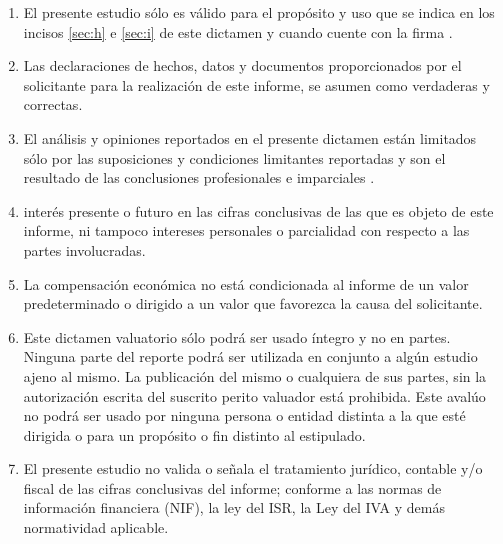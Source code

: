 \begin{enumerate}
	\item El presente estudio s\'olo es v\'alido para el prop\'osito y uso que se indica en los incisos \ref{sec:h} e \ref{sec:i} de este dictamen y cuando cuente con la firma .
	\item Las declaraciones de hechos, datos y documentos proporcionados por el solicitante para la realizaci\'on de este informe, se asumen como verdaderas y correctas.
	\item El an\'alisis y opiniones reportados en el presente dictamen est\'an limitados s\'olo por las suposiciones y condiciones limitantes reportadas y son el resultado de las conclusiones profesionales e imparciales  .
	\item  {} inter\'es presente o futuro en las cifras conclusivas de las que es objeto de este informe, ni tampoco   intereses personales o parcialidad con respecto a las partes involucradas.
	\item La compensaci\'on econ\'omica   no est\'a condicionada al informe de un valor predeterminado o dirigido a un valor que favorezca la causa del solicitante.
	\item Este dictamen valuatorio s\'olo podr\'a ser usado \'integro y no en partes. Ninguna parte del reporte podr\'a ser utilizada en conjunto a alg\'un estudio ajeno al mismo. La publicaci\'on del mismo o cualquiera de sus partes, sin la autorizaci\'on escrita del suscrito perito valuador est\'a prohibida. Este aval\'uo no podr\'a ser usado por ninguna persona o entidad distinta a la que est\'e dirigida o para un prop\'osito o fin distinto al estipulado.
	\item El presente estudio no valida o se\~nala el tratamiento jur\'idico, contable y/o fiscal de las cifras conclusivas del informe; conforme a las normas de informaci\'on financiera (NIF), la ley del ISR, la Ley del IVA y dem\'as normatividad aplicable.

\end{enumerate}
